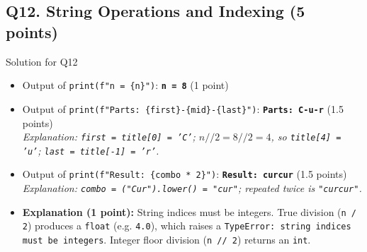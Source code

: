 \documentclass[11pt,a4paper]{article}
\begin{document}
\subsection*{Q12. String Operations and Indexing (5 points)}
\begin{solbox}{Solution for Q12}
\begin{itemize}[leftmargin=2em]
  \item Output of \texttt{print(f"n = \{n\}")}: \textbf{\texttt{n = 8}} (1 point)
  \item Output of \texttt{print(f"Parts: \{first\}-\{mid\}-\{last\}")}: \textbf{\texttt{Parts: C-u-r}} (1.5 points) \\
  \textit{Explanation: \texttt{first = title[0] = 'C'}; $n // 2 = 8 // 2 = 4$, so \texttt{title[4] = 'u'}; \texttt{last = title[-1] = 'r'}.}
  \item Output of \texttt{print(f"Result: \{combo * 2\}")}: \textbf{\texttt{Result: curcur}} (1.5 points) \\
  \textit{Explanation: \texttt{combo = ("Cur").lower() = "cur"}; repeated twice is \texttt{"curcur"}.}
  \item \textbf{Explanation (1 point):} String indices must be integers. True division (\texttt{n / 2}) produces a \texttt{float} (e.g. \texttt{4.0}), which raises a \texttt{TypeError: string indices must be integers}. Integer floor division (\texttt{n // 2}) returns an \texttt{int}.
\end{itemize}
\end{solbox}
\end{document}
